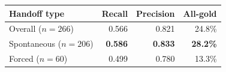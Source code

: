 %
%
\begin{tabular}{@{}lrrr@{}}
\toprule
Handoff type & Recall & Precision & All-gold \\
\midrule
Overall ($n{=}266$)      & 0.566 & 0.821 & 24.8\% \\
\midrule
Spontaneous ($n{=}206$)  & \textbf{0.586} & \textbf{0.833} & \textbf{28.2\%} \\
Forced ($n{=}60$)        & 0.499 & 0.780 & 13.3\% \\
\bottomrule
\end{tabular}
